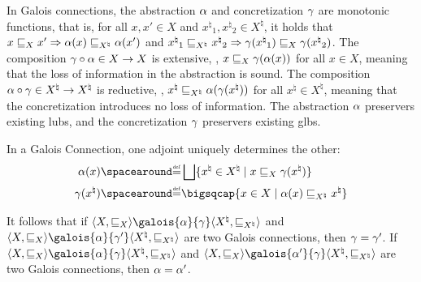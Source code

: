 In Galois connections, the abstraction $\alpha$ and concretization $\gamma$ are monotonic functions, that is, for all $x, x' \in X$ and ${x^\natural}_1, {x^\natural}_2 \in {X^\natural}$, it holds that $x \sqsubseteq_X x' \Rightarrow \alpha(x) \sqsubseteq_{X^\natural} \alpha(x')$ and ${x^\natural}_1 \sqsubseteq_{X^\natural} {x^\natural}_2 \Rightarrow \gamma({x^\natural}_1) \sqsubseteq_X \gamma({x^\natural}_2)$. The composition $\gamma \circ \alpha \in X \to X$ is extensive, \ie, $x \sqsubseteq_X \gamma(\alpha(x))$ for all $x \in X$, meaning that the loss of information in the abstraction is sound. The composition $\alpha \circ \gamma\in {X^\natural} \to {X^\natural}$ is reductive, \ie, ${x^\natural} \sqsubseteq_{X^\natural} \alpha(\gamma({x^\natural}))$ for all ${x^\natural} \in {X^\natural}$, meaning that the concretization introduces no loss of information. The abstraction $\alpha$ preservers existing lubs, and the concretization $\gamma$ preservers existing glbs.

\begin{remark}
  In a Galois Connection, one adjoint uniquely determines the other:
  \begin{align*}
    \abstraction(x) &\DefeQ \bigjoin \setdef{{x^\natural} \in {X^\natural}}{x \sqsubseteq_X \concretization({x^\natural})} \\
    \concretization({x^\natural}) &\DefeQ \bigmeet \setdef{x \in X}{\abstraction(x) \sqsubseteq_{X^\natural} {x^\natural}}
  \end{align*}
\end{remark}


It follows that if $\tuple{X}{\sqsubseteq_X}\galois{\abstraction}{\concretization}\tuple{{X^\natural}}{\sqsubseteq_{X^\natural}}$ and $\tuple{X}{\sqsubseteq_X}\galois{\abstraction}{\concretization'}\tuple{{X^\natural}}{\sqsubseteq_{X^\natural}}$ are two Galois connections, then $\gamma = \gamma'$. If $\tuple{X}{\sqsubseteq_X}\galois{\abstraction}{\concretization}\tuple{{X^\natural}}{\sqsubseteq_{X^\natural}}$ and $\tuple{X}{\sqsubseteq_X}\galois{\abstraction'}{\concretization}\tuple{{X^\natural}}{\sqsubseteq_{X^\natural}}$ are two Galois connections, then $\alpha = \alpha'$.

